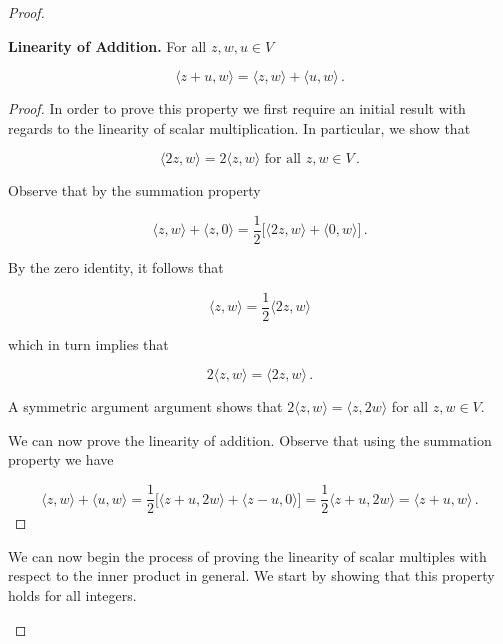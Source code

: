 \documentclass[a4paper]{article}
\numberwithin{equation}{section}
\begin{document}
\begin{description}
\begin{proof}

\begin{description}

\item \textbf{Linearity of Addition.} For all $z,w,u \in V$ 

$$\langle z + u,w \rangle = \langle z,w \rangle + \langle u,w \rangle\,.$$

\begin{proof} In order to prove this property we first require an initial result with regards to the linearity of scalar multiplication. In particular, we show that 

$$\langle 2z,w \rangle = 2\langle z,w \rangle \text{ for all } z,w \in V\,.$$ 

Observe that by the summation property
	
	$$\langle z,w \rangle + \langle z,0 \rangle = \frac{1}{2} \big[ \langle 2z, w\rangle + \langle 0,w \rangle \big]\,.$$
	
	By the zero identity, it follows that
	
	$$\langle z,w \rangle = \frac{1}{2}  \langle 2z, w\rangle$$
	
	which in turn implies that
	
	$$2\langle z,w \rangle = \langle 2z, w\rangle\,.$$

A symmetric  argument argument shows that $2\langle z,w \rangle = \langle z,2w \rangle$ for all $z,w \in V$. 

We can now prove the linearity of addition. Observe that using the summation property we have

$$\langle z,w \rangle + \langle u,w \rangle = \frac{1}{2}\big[ \langle z+u, 2w \rangle + \langle z-u,0 \rangle \big] = \frac{1}{2}\langle z+u,2w \rangle = \langle z+u,w \rangle\,.$$

\end{proof}

\end{description}


We can now begin the process of proving the linearity of scalar multiples with respect to the inner product in general. We start by showing that this property holds for all integers.


\begin{description}


\end{description}
\end{proof}
\end{description}
\end{document}
